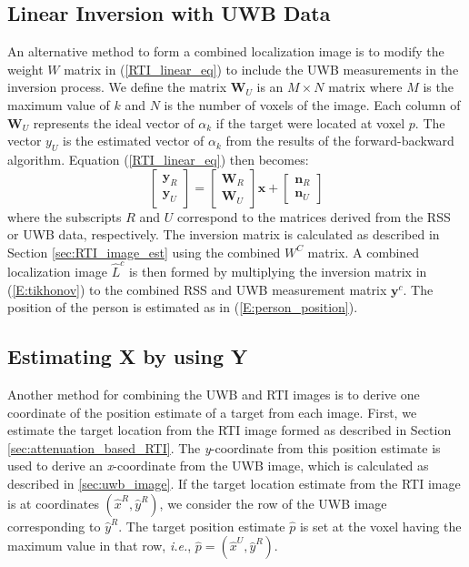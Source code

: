 \documentclass[conference]{IEEEtran}
\begin{document}
\subsection{Linear Inversion with UWB Data} \label{sec:uwb_inversion}

An alternative method to form a combined localization image is to
modify the weight $W$ matrix in (\ref{RTI_linear_eq}) to include the
UWB measurements in the inversion process. We define the matrix
$\mathbf{W}_U$ is an $M \times N$ matrix where $M$ is the maximum
value of $k$ and $N$ is the number of voxels of the image. Each column
of $\mathbf{W}_U$ represents the ideal vector of $\alpha_k$ if the
target were located at voxel $p$. The vector $y_U$ is the estimated
vector of $\alpha_k$ from the results of the forward-backward
algorithm. Equation (\ref{RTI_linear_eq}) then becomes:
\begin{equation}
    \begin{bmatrix}
        \mathbf{y}_R \\
        \mathbf{y}_U
    \end{bmatrix}
    =
    \begin{bmatrix}
        \mathbf{W}_R \\
        \mathbf{W}_U
    \end{bmatrix} \mathbf{x}
    +
    \begin{bmatrix}
        \mathbf{n}_R \\
        \mathbf{n}_U
    \end{bmatrix}
\end{equation}
where the subscripts $R$ and $U$ correspond to the matrices derived
from the RSS or UWB data, respectively. The inversion matrix is
calculated as described in Section \ref{sec:RTI_image_est} using the
combined $W^C$ matrix. A combined localization image $\hat{L}^c$ is
then formed by multiplying the inversion matrix in (\ref{E:tikhonov})
to the combined RSS and UWB measurement matrix $\mathbf{y}^c$. The
position of the person is estimated as in (\ref{E:person_position}).



\subsection{Estimating X by using Y} \label{sec:x_from_y}

Another method for combining the UWB and RTI images is to derive one
coordinate of the position estimate of a target from each
image. First, we estimate the target location from the RTI image
formed as described in Section \ref{sec:attenuation_based_RTI}. The
\emph{y}-coordinate from this position estimate is used to derive an
\emph{x}-coordinate from the UWB image, which is calculated as
described in \ref{sec:uwb_image}. If the target location estimate from
the RTI image is at coordinates $(\hat{x}^R,\hat{y}^R)$, we consider
the row of the UWB image corresponding to $\hat{y}^R$. The target
position estimate $\hat{p}$ is set at the voxel having the maximum
value in that row, \emph{i.e.}, $\hat{p} = (\hat{x}^U,\hat{y}^R)$.
\end{document}

